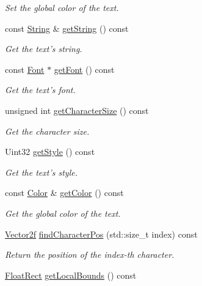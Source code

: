 \begin{DoxyCompactItemize}
\begin{DoxyCompactList}\small\item\em Set the global color of the text. \end{DoxyCompactList}\item 
const \hyperlink{classsf_1_1String}{String} \& \hyperlink{classsf_1_1Text_a14d580e8afdd43c210429505310ecc95}{get\-String} () const 
\begin{DoxyCompactList}\small\item\em Get the text's string. \end{DoxyCompactList}\item 
const \hyperlink{classsf_1_1Font}{Font} $\ast$ \hyperlink{classsf_1_1Text_ab831de193307ab591b34221440613aa1}{get\-Font} () const 
\begin{DoxyCompactList}\small\item\em Get the text's font. \end{DoxyCompactList}\item 
unsigned int \hyperlink{classsf_1_1Text_a9abb85c6966c9879f6ba4d6e47be1dd5}{get\-Character\-Size} () const 
\begin{DoxyCompactList}\small\item\em Get the character size. \end{DoxyCompactList}\item 
Uint32 \hyperlink{classsf_1_1Text_a3f7483a48faf66378da19d36ff6145cf}{get\-Style} () const 
\begin{DoxyCompactList}\small\item\em Get the text's style. \end{DoxyCompactList}\item 
const \hyperlink{classsf_1_1Color}{Color} \& \hyperlink{classsf_1_1Text_ae42818342a74a9d04644e2fbbd4ca29a}{get\-Color} () const 
\begin{DoxyCompactList}\small\item\em Get the global color of the text. \end{DoxyCompactList}\item 
\hyperlink{classsf_1_1Vector2}{Vector2f} \hyperlink{classsf_1_1Text_adf120ed4159e43daa782b17fea23ea82}{find\-Character\-Pos} (std\-::size\-\_\-t index) const 
\begin{DoxyCompactList}\small\item\em Return the position of the {\itshape index-\/th} character. \end{DoxyCompactList}\item 
\hyperlink{classsf_1_1Rect}{Float\-Rect} \hyperlink{classsf_1_1Text_a8a766ea03a1b8899cd1542765771a4ae}{get\-Local\-Bounds} () const 

\end{DoxyCompactItemize}
